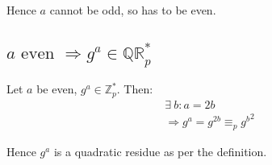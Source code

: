 \documentclass[a4paper]{scrreprt}
\begin{document}
Hence $a$ cannot be odd, so has to be even.

\subsection{$a \text{ even } \Rightarrow g^a \in \mathbb{QR}^*_p$}

Let $a$ be even, $g^a \in \mathbb{Z}^*_p$. Then:
\begin{align*}
	\exists\ b : a = 2b\\
	\Rightarrow g^a = g^{2b} \equiv_p {g^{b}}^{2}
\end{align*}

Hence $g^a$ is a quadratic residue as per the definition.
\end{document}
